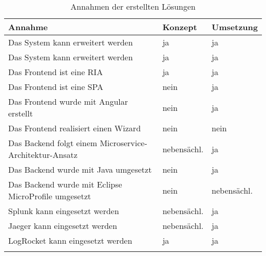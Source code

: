 \begingroup
\centering
\setlength{\LTleft}{-20cm plus -1fill}
\setlength{\LTright}{\LTleft}
\begin{longtable}{|p{10cm}|p{1.9cm}|p{1.9cm}|}
\hline
Annahme & Konzept & Umsetzung \\
\endhead
\hline
Das System kann erweitert werden & ja & ja \\
\hline
Das System kann erweitert werden & ja & ja \\
\hline
Das Frontend ist eine RIA & ja & ja \\
\hline
Das Frontend ist eine SPA & nein & ja \\
\hline
Das Frontend wurde mit Angular erstellt & nein & ja \\
\hline
Das Frontend realisiert einen Wizard & nein & nein \\
\hline
Das Backend folgt einem Microservice-Architektur-Ansatz & nebensächl. & ja \\
\hline
Das Backend wurde mit Java umgesetzt & nein & ja \\
\hline
Das Backend wurde mit Eclipse MicroProfile umgesetzt & nein & nebensächl. \\
\hline
Splunk kann eingesetzt werden & nebensächl. & ja \\
\hline
Jaeger kann eingesetzt werden & nebensächl. & ja \\
\hline
LogRocket kann eingesetzt werden & ja & ja \\
\hline
\caption{Annahmen der erstellten Lösungen}
\label{tab:annahmen-der-erstellten-loesungen}
\end{longtable}
\endgroup
